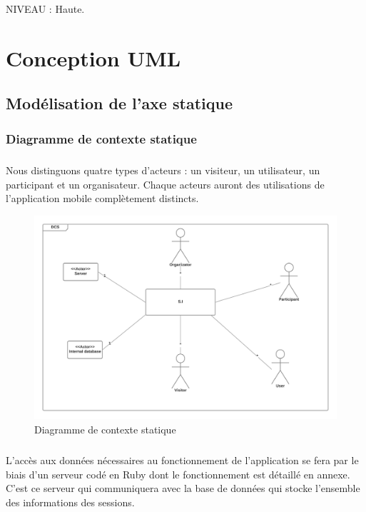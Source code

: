 \documentclass[titlepage, 12pt]{report}
\begin{document}
NIVEAU : Haute.


\chapter{Conception UML}

\section{Modélisation de l'axe statique}

\subsection{Diagramme de contexte statique}

\paragraph{}Nous distinguons quatre types d'acteurs : un visiteur, un utilisateur, un participant et un organisateur. Chaque acteurs auront des utilisations de l'application mobile complètement distincts. 

\begin{figure}
	\caption{Diagramme de contexte statique}
	\label{statique_diagram}
	\centering
	\includegraphics[scale=0.2]{Images/diagram/static_diagram.png}
\end{figure}

\clearpage

\paragraph{}L'accès aux données nécessaires au fonctionnement de l'application se fera par le biais d'un serveur codé en Ruby dont le fonctionnement est détaillé en annexe. C'est ce serveur qui communiquera avec la base de données qui stocke l'ensemble des informations des sessions.
\end{document}
